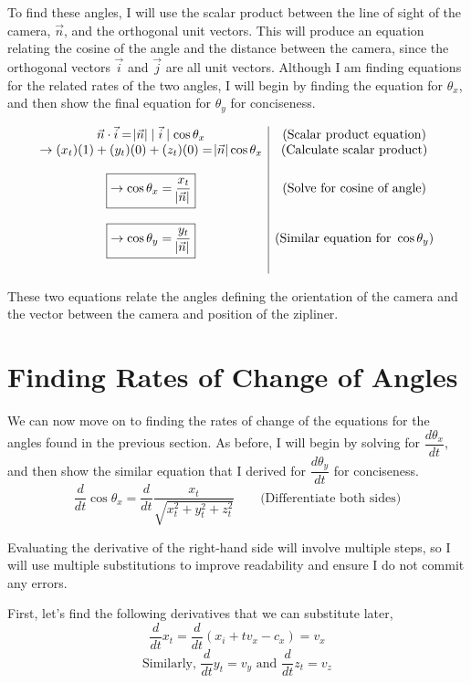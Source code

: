 \documentclass[12pt]{article}
\begin{document}
To find these angles, I will use the scalar product between the line of sight of the camera, $\vec n$, and the orthogonal unit vectors. This will produce an equation relating the cosine of the angle and the distance between the camera, since the orthogonal vectors $\vec i$ and $\vec j$ are all unit vectors. Although I am finding equations for the related rates of the two angles, I will begin by finding the equation for $\theta_x$, and then show the final equation for $\theta_y$ for conciseness.

$$
\begin{array}{c|c}
 \vec n \cdot \vec i =  \abs{\vec n}  \mid \vec i \mid \cos \theta_x & \text{(Scalar product equation)} \\
 \rightarrow (x_t)(1) + (y_t)(0) + (z_t)(0) = \abs{\vec n} \cos \theta_x & \text{(Calculate scalar product)} \\ \\
 \boxed{\rightarrow \cos \theta_x =  \frac{x_t}{\abs{\vec n}}} & \text{(Solve for cosine of angle)}\\ \\
 \boxed{\rightarrow \cos\theta_y =  \frac{y_t}{\abs{\vec n}}} & \text{(Similar equation for } \cos \theta_y \text{)}\\ \\
\end{array}
$$


These two equations relate the angles defining the orientation of the camera and the vector between the camera and position of the zipliner.


\section{Finding Rates of Change of Angles}

We can now move on to finding the rates of change of the equations for the angles found in the previous section. As before, I will begin by solving for $\dfrac{d\theta_x}{dt}$, and then show the similar equation that I derived for $\dfrac{d\theta_y}{dt}$ for conciseness.
$$\frac{d}{dt}\cos \theta_x = \frac{d}{dt} \frac{x_t}{\sqrt{x_t^2+y_t^2+z_t^2}} \quad \quad \text{(Differentiate both sides)}$$

Evaluating the derivative of the right-hand side will involve multiple steps, so I will use multiple substitutions to improve readability and ensure I do not commit any errors.

First, let's find the following derivatives that we can substitute later, 
$$\frac{d}{dt} x_t = \frac{d}{dt} (x_i + tv_x - c_x) = v_x$$
$$\text{Similarly, }\frac{d}{dt} y_t = v_y \text{ and }\frac{d}{dt} z_t = v_z$$
\end{document}
